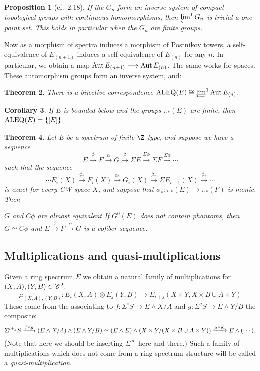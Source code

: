 \documentclass[11pt]{article}
\theoremstyle{plain}
\newtheorem{thm}{Theorem}[subsection]
\newtheorem{prop}[thm]{Proposition}
\newtheorem{cor}[thm]{Corollary}
\theoremstyle{definition}
\newcommand{\CW}{\scrC}
\newcommand{\ALEQ}{\textup{ALEQ}}
\begin{document}
{\begin{prop}[cf.\ 2.18]
If the $G_n$ form an inverse system of compact topological groups with
continuous homomorphisms, then $\varprojlim^1G_n$ is trivial \lparen a one point
set\rparen. This holds in particular when the $G_n$ are finite groups.
\end{prop}
Now as a morphism of spectra induces a morphism of Postnikov towers, a
self-equivalence of $E_{(n+1)}$ induces a self equivalence of $E_{(n)}$ for any
$n$. In particular, we obtain a map $\operatorname{Aut} E_{(n+1)}\longrightarrow \operatorname{Aut} E_{(n)}$. The same
works for spaces. These automorphism groups form an inverse system, and:
\begin{thm}
There is a bijective correspondence $\ALEQ(E)\cong\varprojlim^1\Aut E_{(n)}$.
\end{thm}
\begin{cor}
If $E$ is bounded below and the groups $\pi_*(E)$ are finite, then
$\ALEQ(E)=\{[E]\}$.
\end{cor}
\begin{thm}
Let $E$ be a spectrum of finite $\Z$-type, and suppose we have a sequence\upcol
\[E\xrightarrow{\,\phi\,}F\xrightarrow{\,\alpha\,}G\xrightarrow{\,\beta\,}\Sigma 
E\xrightarrow{\Sigma\phi}\Sigma F\xrightarrow{\Sigma\alpha}\cdots\]
such that the sequence
\[\cdots E_i(X)\xrightarrow{\,\phi_*\,}F_i(X)\xrightarrow{\,
\alpha_*\,}G_i(X)\xrightarrow{\,\beta_*\,}\Sigma E_{i-1}(X)\xrightarrow{\,
\phi_*\,}\cdots\]
is exact for every CW-space $X$, and suppose that $\phi_*:\pi_*(E)\to\pi_*(F)$
is monic. Then\upcol
\begin{itemise}
\itm[(i)]$G$ and $C\phi$ are almost equivalent\upsemi
\itm[(ii)]If $G^0(E)$ does not contain phantoms, then $G\simeq C\phi$ and
$E\xrightarrow{\,\phi\,}F\xrightarrow{\,\alpha\,}G$ is a cofiber sequence.
\end{itemise}
\end{thm}
}   %
\subsection{Multiplications and quasi-multiplications}
Given a ring spectrum $E$ we obtain a natural family of multiplications for
$(X,A),(Y,B)\in\CW^2$:
\[\mu_{(X,A),(Y,B)}:E_i(X,A)\otimes E_j(Y,B)\to E_{i+j}(X\times Y,X\times B\cup
A\times Y)\]
These come from the associating to $f:\Sigma^iS\to E\wedge X/A$ and
$g:\Sigma^jS\to E\wedge Y/B$ the composite:%
\[\Sigma^{i+j}S\xrightarrow{f\wedge g}(E\wedge X/A)\wedge(E\wedge
Y/B)\simeq(E\wedge E)\wedge(X\times Y/(X\times B\cup A\times
Y))\xrightarrow{\mu\wedge\textup{id}}E\wedge(\cdots).\]
(Note that here we should be inserting $\Sigma^\infty$ here and there.)
Such a family of multiplications which does not come from a ring spectrum
structure will be called a \emph{quasi-multiplication}.
\end{document}
